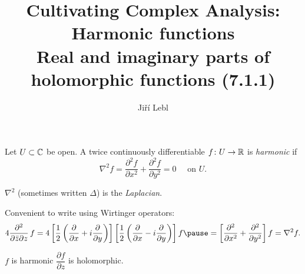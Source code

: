 \documentclass[10pt,aspectratio=169]{beamer}
\author{Ji\v{r}\'i Lebl}
\institute[OSU]{%
Departemento pri Matematiko de Oklahoma {\^S}tata Universitato}
\title{Cultivating Complex Analysis:\\%
Harmonic functions\\%
Real and imaginary parts of holomorphic functions (7.1.1)}
\date{}
\begin{document}
\begin{frame}
\titlepage
\end{frame}

\begin{frame}
\begin{definition}
Let $U \subset {\mathbb{C}}$ be open.
A twice continuously differentiable $f \colon U \to {\mathbb{R}}$ is
\emph{harmonic} if
\begin{equation*}
\nabla^2 f =
\frac{\partial^2 f}{\partial x^2} +
\frac{\partial^2 f}{\partial y^2} = 0
\quad \text{ on $U$.}
\end{equation*}
\end{definition}

\pause

$\nabla^2$ (sometimes written $\Delta$) is the \emph{Laplacian}.

\pause
\medskip

Convenient to write using Wirtinger operators:
\begin{equation*}
4
\frac{\partial^2}{\partial \bar{z}\partial z} \, f =
4
\left[
\frac{1}{2}
\left(
\frac{\partial}{\partial x} + i
\frac{\partial}{\partial y}
\right)
\right]
\left[
\frac{1}{2}
\left(
\frac{\partial}{\partial x} - i
\frac{\partial}{\partial y}
\right)
\right]
f
\pause
=
\left[
\frac{\partial^2}{\partial x^2} +
\frac{\partial^2}{\partial y^2}
\right]
f
=
\nabla^2 f .
\end{equation*}

\pause
\medskip

$f$ is harmonic \wiffif $\dfrac{\partial f}{\partial z}$ is holomorphic.

\end{frame}
\end{document}
